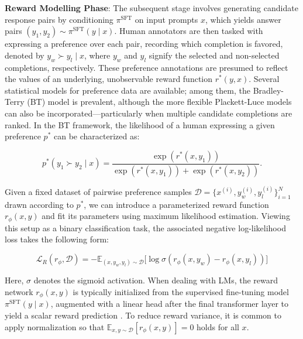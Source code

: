 \textbf{Reward Modelling Phase}: The subsequent stage involves generating candidate response pairs by conditioning $\pi^\text{SFT}$ on input prompts $x$, which yields answer pairs $(y_1, y_2)\sim \pi^\text{SFT}(y \mid x)$. Human annotators are then tasked with expressing a preference over each pair, recording which completion is favored, denoted by $y_w\succ y_l \mid x$, where $y_w$ and $y_l$ signify the selected and non-selected completions, respectively. These preference annotations are presumed to reflect the values of an underlying, unobservable reward function $r^*(y, x)$. Several statistical models for preference data are available; among them, the Bradley-Terry (BT) model \cite{bradley1952rankanalysis} is prevalent, although the more flexible Plackett-Luce models \citep{plackett1975analysis, luce2012individual} can also be incorporated—particularly when multiple candidate completions are ranked. In the BT framework, the likelihood of a human expressing a given preference $p^*$ can be characterized as:

\begin{equation}\label{eq:bradley-terry}
    p^*(y_1\succ y_2 \mid x)=\frac{\exp\left(r^*(x, y_1)\right)}{\exp\left(r^*(x, y_1)\right) + \exp\left(r^*(x, y_2)\right)}.
\end{equation}

Given a fixed dataset of pairwise preference samples $\mathcal{D}=\bigl\{x^{(i)}, y_w^{(i)}, y_l^{(i)}\bigr\}_{i=1}^N$ drawn according to $p^*$, we can introduce a parameterized reward function $r_{\phi}(x, y)$ and fit its parameters using maximum likelihood estimation. Viewing this setup as a binary classification task, the associated negative log-likelihood loss takes the following form:

\begin{equation}\label{eq:reward_model}
    \mathcal{L}_R(r_{\phi}, \mathcal{D}) = -\mathbb{E}_{(x, y_w, y_l)\sim \mathcal{D}}\bigl[\log \sigma(r_{\phi}(x, y_w)- r_{\phi}(x, y_l))\bigr]
\end{equation}

Here, $\sigma$ denotes the sigmoid activation. When dealing with LMs, the reward network $r_{\phi}(x, y)$ is typically initialized from the supervised fine-tuning model $\pi^\text{SFT}(y \mid x)$, augmented with a linear head after the final transformer layer to yield a scalar reward prediction \cite{ziegler2020finetuning}. To reduce reward variance, it is common to apply normalization so that $\mathbb{E}_{x,y\sim \mathcal{D}}\left[r_\phi(x, y)\right] = 0$ holds for all $x$.

